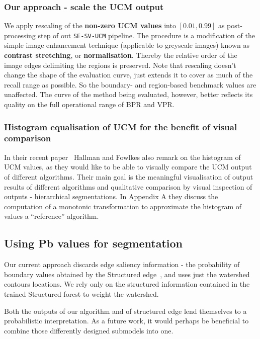 \subsubsection{Our approach - scale the UCM output} %
We apply rescaling of the {\bf non-zero UCM values} into $[0.01, 0.99]$ as post-processing step of out {\tt SE-SV-UCM} pipeline. The procedure is a modification of the simple image enhancement technique (applicable to greyscale images) known as {\bf contrast stretching}, or {\bf normalisation}. Thereby the relative order of the image edges delimiting the regions is preserved. Note that rescaling doesn't change the shape of the evaluation curve, just extends it to cover as much of the recall range as possible. So the boundary- and region-based benchmark values are unaffected. The curve of the method being evaluated, however, better reflects its quality on the full operational range of BPR and VPR.

\subsubsection{Histogram equalisation of UCM for the benefit of visual comparison}
In their recent paper~\cite{Hallman2014} Hallman and Fowlkes also remark on the histogram of UCM values, as they would like to be able to visually compare the UCM output of different algorithms. Their main goal is the meaningful visualisation of output results of different algorithms and qualitative comparison by visual inspection of outputs - hierarchical segmentations. In Appendix A they discuss the computation of a monotonic transformation to approximate the histogram of values \wrt a ``reference'' algorithm.

\subsection{Using Pb values for segmentation} %
Our current approach discards edge saliency information - the probability of boundary values obtained by the Structured edge~\cite{DollarICCV13edges}, and uses just the watershed contours locations. We rely only on the structured information contained in the trained Structured forest to weight the watershed.

Both the outputs of our algorithm and of structured edge lend themselves to %
a probabilistic interpretation. As a future work, it would perhaps be beneficial to combine those differently designed submodels into one.
